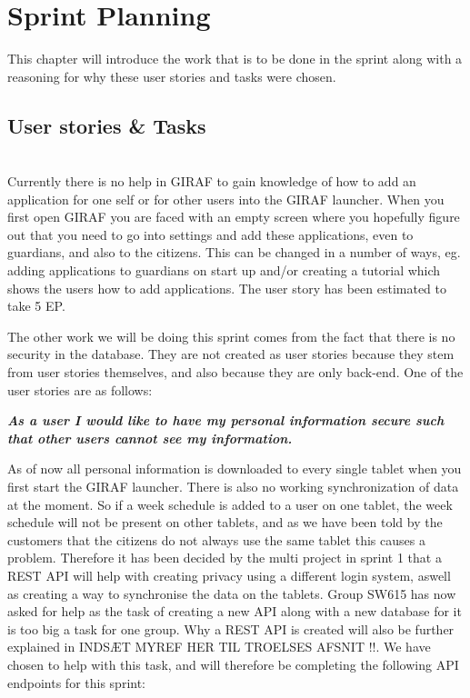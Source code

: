 \chapter{Sprint Planning}
This chapter will introduce the work that is to be done in the sprint along with a reasoning for why these user stories and tasks were chosen.

\section{User stories \& Tasks}
\begin{description}[style=unboxed]
    \item[{[}\phigh{]} As a guardian I would like the launcher to tell me how to add applications if none are active, such that it is easier to add applications for beginners.] \hfill \\ 
    Currently there is no help in GIRAF to gain knowledge of how to add an application for one self or for other users into the GIRAF launcher.
    When you first open GIRAF you are faced with an empty screen where you hopefully figure out that you need to go into settings and add these applications, even to guardians, and also to the citizens.
    This can be changed in a number of ways, eg. adding applications to guardians on start up and/or creating a tutorial which shows the users how to add applications.
    The user story has been estimated to take 5 EP.
\end{description}
The other work we will be doing this sprint comes from the fact that there is no security in the database.
They are not created as user stories because they stem from user stories themselves, and also because they are only back-end.
One of the user stories are as follows:

\textbf{\textit{As a user I would like to have my personal information secure such that other users cannot see my information.}}

As of now all personal information is downloaded to every single tablet when you first start the GIRAF launcher.
There is also no working synchronization of data at the moment. 
So if a week schedule is added to a user on one tablet, the week schedule will not be present on other tablets, and as we have been told by the customers that the citizens do not always use the same tablet this causes a problem.
Therefore it has been decided by the multi project in sprint 1 that a REST API will help with creating privacy using a different login system, aswell as creating a way to synchronise the data on the tablets.
Group SW615 has now asked for help as the task of creating a new API along with a new database for it is too big a task for one group.
Why a REST API is created will also be further explained in INDSÆT MYREF HER TIL TROELSES AFSNIT !!.
We have chosen to help with this task, and will therefore be completing the following API endpoints for this sprint: 


